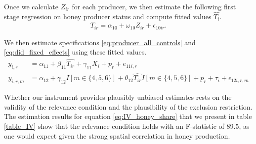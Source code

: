 \documentclass[../main.tex]{subfiles}
\begin{document}
Once we calculate $Z_{ir}$ for each producer,  we then estimate the following first stage regression on honey producer status and compute fitted values $\hat{T_i}$.
\begin{align}
T_{ir} = \alpha_{10} + \omega_{10}Z_{ir} + \epsilon_{10ir}.
\end{align}

We then estimate specifications \ref{eq:producer_all_controls} and
\ref{eq:did_fixed_effects} using these fitted values.
\begin{align}
y_{i,r} &= \alpha_{11} + \beta_{11} \widehat{T_{ir}} + \gamma_{11} X_i + p_r + e_{11i,r} \\
y_{i,r,m} &= \alpha_{12} + \gamma_{12}{I}[m \in \{4,5,6\}] + \theta_{12}\widehat{T_{ir}}{I}[m \in \{4,5,6\}] + p_r + \tau_{i} + \epsilon_{12i,r,m} 
\end{align}

Whether our instrument provides plausibly unbiased estimates rests on the validity of the relevance condition and the plausibility of the exclusion restriction. The estimation results for equation \ref{eq:IV_honey_share} that we present in table \ref{table_IV} show that the relevance condition holds with an F-statistic of 89.5, as one would expect given the strong spatial correlation in honey production. 
\end{document}
